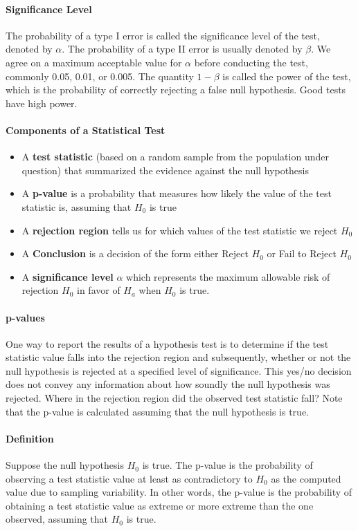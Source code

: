 \paragraph*{Significance Level}
The probability of a type I error is called the significance level of the test, denoted by $\alpha$. The probability of a type II error 
is usually denoted by $\beta$. We agree on a maximum acceptable value for $\alpha$ before conducting the test, commonly 0.05, 0.01, or 0.005.
The quantity $1 - \beta$ is called the power of the test, which is the probability of correctly rejecting a false null hypothesis. Good tests
have high power.

\paragraph*{Components of a Statistical Test}
\begin{itemize}
    \item A \textbf{test statistic} (based on a random sample from the population under question) that summarized the evidence against the null hypothesis
    \item A \textbf{p-value} is a probability that measures how likely the value of the test statistic is, assuming that $H_0$ is true
    \item A \textbf{rejection region} tells us for which values of the test statistic we reject $H_0$
    \item A \textbf{Conclusion} is a decision of the form either Reject $H_0$ or Fail to Reject $H_0$
    \item A \textbf{significance level} $\alpha$ which represents the maximum allowable risk of rejection $H_0$ in favor of $H_a$ when $H_0$ is true.
\end{itemize}

\paragraph*{p-values}
One way to report the results of a hypothesis test is to determine if the test statistic value falls into the rejection region and subsequently, whether or not the 
null hypothesis is rejected at a specified level of significance. This yes/no decision does not convey any information about how soundly the 
null hypothesis was rejected. Where in the rejection region did the observed test statistic fall? Note that the p-value is calculated assuming
that the null hypothesis is true.

\paragraph*{Definition}
Suppose the null hypothesis $H_0$ is true. The p-value is the probability of observing a test statistic value 
at least as contradictory to $H_0$ as the computed value due to sampling variability. In other words, the p-value is the probability of obtaining a test statistic
value as extreme or more extreme than the one observed, assuming that $H_0$ is true.

